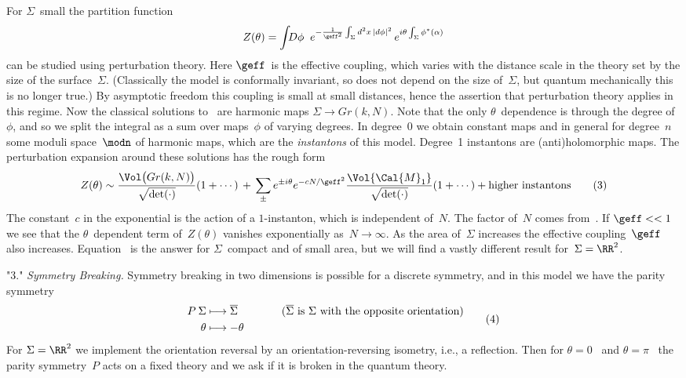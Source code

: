  For $\Sigma $~small the partition function 
  $$ Z(\theta ) = \int_{} D\phi \;\;e^{-\frac{1}{\geff^2}\int_{\Sigma
     }d^2x\,|d\phi |^2} \,e^{i\theta \int_{\Sigma }\phi ^*(\alpha )}
      $$
can be studied using perturbation theory.  Here $\geff$~is the effective
coupling, which varies with the distance scale in the theory set by the size
of the surface~$\Sigma $.  (Classically the model is conformally invariant,
so does not depend on the size of~$\Sigma $, but quantum mechanically this is
no longer true.)  By asymptotic freedom this coupling is small at small
distances, hence the assertion that perturbation theory applies in this
regime.  Now the classical solutions to~ are harmonic maps $\Sigma
\to Gr(k,N)$.  Note that the only $\theta $~dependence is through the degree
of~$\phi $, and so we split the integral as a sum over maps~$\phi $ of
varying degrees.  In degree~0 we obtain constant maps and in general for
degree~$n$ some moduli space~$\modn$ of harmonic maps, which are the {\it
instantons\/} of this model.  Degree~1 instantons are (anti)holomorphic maps.
The perturbation expansion around these solutions has the rough form
  $$ Z(\theta ) \sim \frac{\Vol\bigl(Gr(k,N) \bigr)}{\sqrt{\det(\cdot
     )}}(1+\cdots ) \,+\, \sum\limits_{\pm}e^{\pm i\theta }e^{-cN/\geff^2}
     \frac{\Vol{\Cal{M}_1}}{\sqrt{\det(\cdot )}}(1+\cdots ) + \text{higher
     instantons} \tag{3} $$
The constant~$c$ in the exponential is the action of a $1$-instanton, which
is independent of~$N$.  The factor of~$N$ comes from~.  If $\geff
<< 1$ we see that the $\theta $~dependent term of~$Z(\theta )$ vanishes
exponentially as~$N\to\infty $.  As the area of~$\Sigma $ increases the
effective coupling~$\geff$ also increases.  Equation~ is the answer
for $\Sigma $~compact and of small area, but we will find a vastly different
result for~$\Sigma =\RR^2$.

 \item"3." {\it Symmetry Breaking.\/}  Symmetry breaking in two dimensions
is possible for a discrete symmetry, and in this model we have the parity
symmetry
  $$ \aligned
      P\:\Sigma &\longmapsto \overline{\Sigma}\qquad \qquad
     \text{($\overline{\Sigma}$~is $\Sigma$ with the opposite orientation)}
     \\
      \theta &\longmapsto -\theta \endaligned \tag{4} $$
For $\Sigma =\RR^2$ we implement the orientation reversal by an
orientation-reversing isometry, i.e., a reflection.  Then for $\theta =0$~
and $\theta =\pi$ ~the parity symmetry~$P$ acts on a fixed theory and we ask
if it is broken in the quantum theory.
 

